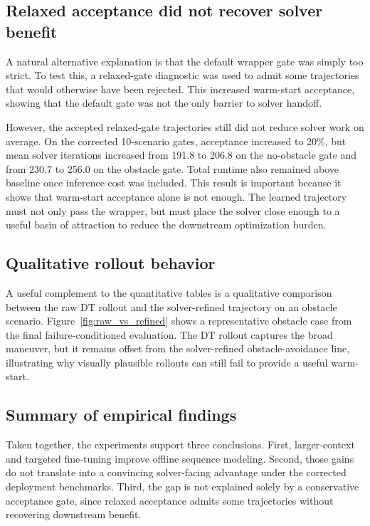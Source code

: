 \subsection{Relaxed acceptance did not recover solver benefit}

A natural alternative explanation is that the default wrapper gate was simply too strict. To test this, a relaxed-gate diagnostic was used to admit some trajectories that would otherwise have been rejected. This increased warm-start acceptance, showing that the default gate was not the only barrier to solver handoff.

However, the accepted relaxed-gate trajectories still did not reduce solver work on average. On the corrected 10-scenario gates, acceptance increased to 20\%, but mean solver iterations increased from 191.8 to 206.8 on the no-obstacle gate and from 230.7 to 256.0 on the obstacle gate. Total runtime also remained above baseline once inference cost was included. This result is important because it shows that warm-start acceptance alone is not enough. The learned trajectory must not only pass the wrapper, but must place the solver close enough to a useful basin of attraction to reduce the downstream optimization burden.

\subsection{Qualitative rollout behavior}

A useful complement to the quantitative tables is a qualitative comparison between the raw DT rollout and the solver-refined trajectory on an obstacle scenario. Figure~\ref{fig:raw_vs_refined} shows a representative obstacle case from the final failure-conditioned evaluation. The DT rollout captures the broad maneuver, but it remains offset from the solver-refined obstacle-avoidance line, illustrating why visually plausible rollouts can still fail to provide a useful warm-start.

\subsection{Summary of empirical findings}

Taken together, the experiments support three conclusions. First, larger-context and targeted fine-tuning improve offline sequence modeling. Second, those gains do not translate into a convincing solver-facing advantage under the corrected deployment benchmarks. Third, the gap is not explained solely by a conservative acceptance gate, since relaxed acceptance admits some trajectories without recovering downstream benefit.
